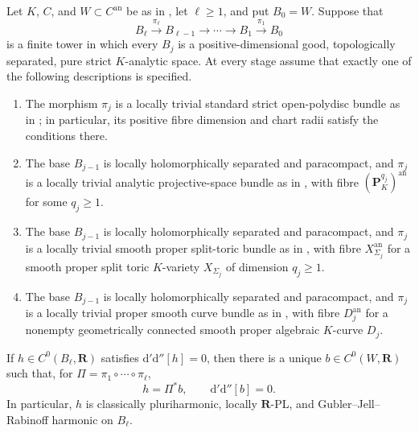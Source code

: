 \begin{theorem}
\label{thm:p062-mixed-bundle-towers-over-curves}
Let $K$, $C$, and $W\subset C^{\mathrm{an}}$ be as in
, let $\ell\geq1$, and put $B_0=W$.
Suppose that
\[
 B_\ell\xrightarrow{\pi_\ell}B_{\ell-1}
 \longrightarrow\cdots\longrightarrow B_1
 \xrightarrow{\pi_1}B_0
\]
is a finite tower in which every $B_j$ is a positive-dimensional good,
topologically separated, pure strict $K$-analytic space.  At every stage
assume that exactly one of the following descriptions is specified.
\begin{enumerate}
\item The morphism $\pi_j$ is a locally trivial standard strict
open-polydisc bundle as in
; in particular, its positive
fibre dimension and chart radii satisfy the conditions there.
\item The base $B_{j-1}$ is locally holomorphically separated and
paracompact, and $\pi_j$ is a locally trivial analytic projective-space
bundle as in , with fibre
$(\mathbf P_K^{q_j})^{\mathrm{an}}$ for some $q_j\geq1$.
\item The base $B_{j-1}$ is locally holomorphically separated and
paracompact, and $\pi_j$ is a locally trivial smooth proper split-toric
bundle as in
, with fibre
$X_{\Sigma_j}^{\mathrm{an}}$ for a smooth proper split toric $K$-variety
$X_{\Sigma_j}$ of dimension $q_j\geq1$.
\item The base $B_{j-1}$ is locally holomorphically separated and
paracompact, and $\pi_j$ is a locally trivial proper smooth curve bundle
as in , with fibre
$D_j^{\mathrm{an}}$ for a nonempty geometrically connected smooth proper
algebraic $K$-curve $D_j$.
\end{enumerate}
If $h\in C^0(B_\ell,\mathbf R)$ satisfies
$\mathrm d'\mathrm d''[h]=0$, then there is a unique
$b\in C^0(W,\mathbf R)$ such that, for
$\Pi=\pi_1\circ\cdots\circ\pi_\ell$,
\[
                  h=\Pi^*b,
                  \qquad \mathrm d'\mathrm d''[b]=0.
\]
In particular, $h$ is classically pluriharmonic, locally
$\mathbf R$-PL, and Gubler--Jell--Rabinoff harmonic on $B_\ell$.
\end{theorem}
